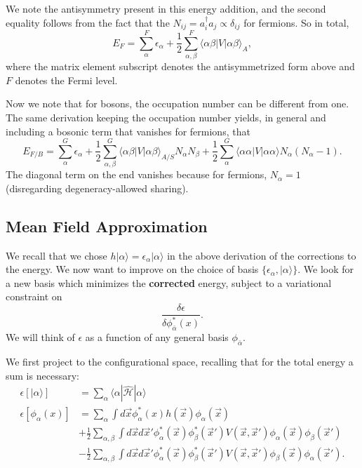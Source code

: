 \documentclass[fontsize=12pt]{scrartcl}
\newcommand{\la}{\langle}
\newcommand{\ra}{\rangle}
\newcommand{\Ham}{\hat{\mathcal{H}}}
\begin{document}
 We note the antisymmetry present in this energy addition, and the second equality follows from the fact that the $N_{ij}=a^\dagger_i a_j \propto \delta_{ij}$ for fermions. So in total, $$E_F = \sum_{\alpha}^{F} \epsilon_\alpha + \frac{1}{2} \sum_{\alpha,\beta}^{F}\la \alpha\beta|V|\alpha\beta\ra_A,$$ where the matrix element subscript denotes the antisymmetrized form above and $F$ denotes the Fermi level.
 
 Now we note that for bosons, the occupation number can be different from one. The same derivation keeping the occupation number yields, in general and including a bosonic term that vanishes for fermions, that $$E_{F/B} = \sum_{\alpha}^{G} \epsilon_\alpha + \frac{1}{2}\sum_{\alpha,\beta}^{G}\la \alpha\beta|V|\alpha\beta\ra_{A/S} N_\alpha N_\beta + \frac{1}{2}\sum_{\alpha}^G \la \alpha\alpha|V|\alpha\alpha\ra N_\alpha(N_\alpha-1).$$ The diagonal term on the end vanishes because for fermions, $N_\alpha=1$ (disregarding degeneracy-allowed sharing).
 
 \subsection{Mean Field Approximation}
 
 We recall that we chose $h|\alpha\ra = \epsilon_\alpha|\alpha\ra$ in the above derivation of the corrections to the energy. We now want to improve on the choice of basis $\{\epsilon_\alpha,|\alpha\ra\}.$ We look for a new basis which minimizes the \textbf{corrected} energy, subject to a variational constraint on $$\frac{\delta\epsilon}{\delta \phi_{\bar{\alpha}}^*(x)}.$$ We will think of $\epsilon$ as a function of any general basis $\phi_{\bar{\alpha}}$.
 
 We first project to the configurational space, recalling that for the total energy a sum is necessary: \begin{align*}
 \epsilon[|\alpha\ra] &= \sum_{\alpha} \la \alpha|\Ham|\alpha\ra \\
 \epsilon[\phi_\alpha(x)] &= \sum_{\alpha} \int d\vec{x} \phi_\alpha^*(x) h(\vec{x})\phi_\alpha(\vec{x})\\ &+ \frac{1}{2}\sum_{\alpha,\beta} \int d\vec{x}d\vec{x}' \phi^*_\alpha(\vec{x})\phi^*_\beta(\vec{x}') V(\vec{x},\vec{x}')\phi_\alpha(\vec{x})\phi_\beta(\vec{x}')\\
 &- \frac{1}{2}\sum_{\alpha,\beta} \int d\vec{x}d\vec{x}' \phi^*_\alpha(\vec{x})\phi^*_\beta(\vec{x}') V(\vec{x},\vec{x}')\phi_\beta(\vec{x})\phi_\alpha(\vec{x}').
 \end{align*}
 
\end{document}
